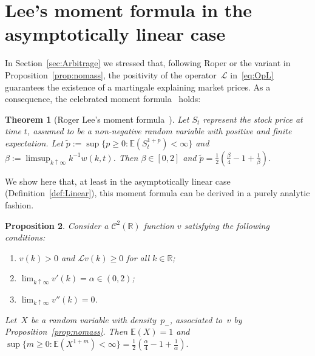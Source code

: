 \documentclass{amsart}[11pt]
\numberwithin{equation}{section}
\newtheorem{theorem}{Theorem}[section]
\newtheorem{proposition}[theorem]{Proposition}
\theoremstyle{definition}
\newcommand{\RR}{\mathbb{R}}
\newcommand{\Ll}{\mathcal{L}}
\begin{document}
\section{Lee's moment formula in the asymptotically linear case}
In Section~\ref{sec:Arbitrage} we stressed that, following Roper or the variant in Proposition~\ref{prop:nomass},
the positivity of the operator~$\Ll$ in~\eqref{eq:OpL} guarantees the existence of a martingale explaining market prices. 
As a consequence, the celebrated moment formula~\cite{Lee} holds:
\begin{theorem}[Roger Lee's moment formula~\cite{Lee}]\label{thm:LeeMoment}
Let $S_t$ represent the stock price at time $t$, assumed to be a non-negative random variable with positive and finite expectation.
Let $\widetilde{p}:=\sup\{p\geq 0: \mathbb{E}(S_t^{1+p})<\infty\}$ and $\beta:=\limsup_{k\uparrow\infty}k^{-1}w(k,t)$.
Then $\beta\in [0,2]$ and $\widetilde{p}=\frac{1}{2}\left(\frac{\beta}{4}-1+\frac{1}{\beta}\right)$.
\end{theorem}
We show here that, at least in the asymptotically linear case (Definition~\ref{def:Linear}), 
this moment formula can be derived in a purely analytic fashion.
\begin{proposition}
Consider a $\mathcal{C}^2(\RR)$ function $v$ satisfying the following conditions:
\begin{enumerate}
\item $v(k)>0$ and $\Ll v(k) \geq 0$ for all $k \in \mathbb{R}$;
\item $\lim_{k\uparrow \infty} v'(k) = \alpha \in (0,2)$;
\item $\lim_{k\uparrow \infty} v''(k)=0$.
\end{enumerate}
Let~$X$ be a random variable with density~$p_-$, associated to~$v$ by Proposition~\ref{prop:nomass}.
Then $\mathbb{E}(X)=1$ and 
$\displaystyle \sup \{m\geq 0 : \mathbb{E}(X^{1+m}) < \infty \} 
= \frac{1}{2}\left(\frac{\alpha}{4}-1+\frac{1}{\alpha}\right).$
\end{proposition}
\end{document}
